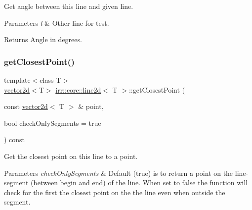 Get angle between this line and given line. 


\begin{DoxyParams}{Parameters}
{\em l} & Other line for test. \\
\hline
\end{DoxyParams}
\begin{DoxyReturn}{Returns}
Angle in degrees. 
\end{DoxyReturn}
\mbox{\label{classirr_1_1core_1_1line2d_af049709fbc870bdc317ec27df95280cb}} 
\subsubsection{\texorpdfstring{get\+Closest\+Point()}{getClosestPoint()}\hspace{0.1cm}{\footnotesize\ttfamily [1/2]}}
{\footnotesize\ttfamily template$<$class T$>$ \\
\hyperlink{classirr_1_1core_1_1vector2d}{vector2d}$<$T$>$ \hyperlink{classirr_1_1core_1_1line2d}{irr\+::core\+::line2d}$<$ T $>$\+::get\+Closest\+Point (\begin{DoxyParamCaption}\item[{const \hyperlink{classirr_1_1core_1_1vector2d}{vector2d}$<$ T $>$ \&}]{point,  }\item[{bool}]{check\+Only\+Segments = {\ttfamily true} }\end{DoxyParamCaption}) const\hspace{0.3cm}{\ttfamily [inline]}}



Get the closest point on this line to a point. 


\begin{DoxyParams}{Parameters}
{\em check\+Only\+Segments} & Default (true) is to return a point on the line-\/segment (between begin and end) of the line. When set to false the function will check for the first the closest point on the the line even when outside the segment. \\
\hline
\end{DoxyParams}
\mbox{\label{classirr_1_1core_1_1line2d_af049709fbc870bdc317ec27df95280cb}} 

